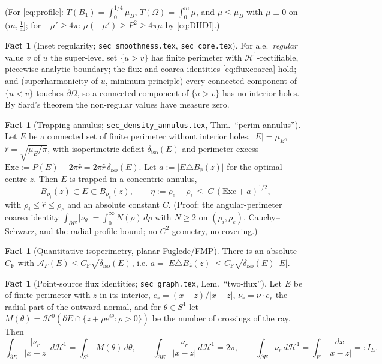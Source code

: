 \documentclass[11pt]{article}
\theoremstyle{definition}
\newtheorem{fact}[theorem]{Fact}
\newcommand{\Om}{\Omega}
\newcommand{\HH}{\mathcal H}
\newcommand{\diso}{\delta_{\mathrm{iso}}}
\newcommand{\AF}{\mathcal A_F}
\newcommand{\Exc}{\mathrm{Exc}}
\newcommand{\abs}[1]{\left|#1\right|}
\begin{document}
\noindent
(For \eqref{eq:profile}: $T(B_1)=\int_0^{1/4}\mu_B$, $T(\Om)=\int_0^m\mu$,
and $\mu\le\mu_B$ with $\mu\equiv0$ on $(m,\tfrac14]$; for $-\mu'\ge4\pi$:
$\mu(-\mu')\ge P^2\ge4\pi\mu$ by \eqref{eq:DHDI}.)

\begin{fact}[Inset regularity; \texttt{sec\_smoothness.tex},
\texttt{sec\_core.tex}]\label{fact:reg}
For a.e.\ \emph{regular} value $v$ of $u$ the super-level set $\{u>v\}$ has
finite perimeter with $\HH^1$-rectifiable, piecewise-analytic boundary; the
flux and coarea identities \eqref{eq:fluxcoarea} hold; and (superharmonicity
of $u$, minimum principle) every connected component of $\{u<v\}$ touches
$\partial\Om$, so a connected component of $\{u>v\}$ has no interior holes.
By Sard's theorem the non-regular values have measure zero.
\end{fact}

\begin{fact}[Trapping annulus; \texttt{sec\_density\_annulus.tex},
Thm.~``perim-annulus'']\label{fact:annulus}
Let $E$ be a connected set of finite perimeter without interior holes,
$\abs E=\mu_E$, $\hat r=\sqrt{\mu_E/\pi}$, with isoperimetric deficit
$\diso(E)$ and perimeter excess $\Exc:=P(E)-2\pi\hat r=2\pi\hat r\,\diso(E)$.
Let $a:=\abs{E\triangle B_{\hat r}(z)}$ for the optimal centre $z$. Then $E$
is trapped in a concentric annulus,
\begin{equation}\label{eq:annulus}
   B_{\rho_i}(z)\subset E\subset B_{\rho_e}(z),\qquad
   \eta:=\rho_e-\rho_i\ \le\ C\,(\Exc+a)^{1/2},
\end{equation}
with $\rho_i\le\hat r\le\rho_e$ and an absolute constant $C$. (Proof: the
angular-perimeter coarea identity
$\int_{\partial E}\abs{\nu_\theta}=\int_0^\infty N(\rho)\,d\rho$ with
$N\ge2$ on $(\rho_i,\rho_e)$, Cauchy--Schwarz, and the radial-profile bound;
no $C^2$ geometry, no covering.)
\end{fact}

\begin{fact}[Quantitative isoperimetry, planar Fuglede/FMP]\label{fact:fmp}
There is an absolute $C_{\mathrm F}$ with
$\AF(E)\le C_{\mathrm F}\sqrt{\diso(E)}$, i.e.
$a=\abs{E\triangle B_{\hat r}(z)}\le C_{\mathrm F}\sqrt{\diso(E)}\,\abs E$.
\end{fact}

\begin{fact}[Point-source flux identities; \texttt{sec\_graph.tex},
Lem.~``two-flux'']\label{fact:flux}
Let $E$ be of finite perimeter with $z$ in its interior, $e_r=(x-z)/|x-z|$,
$\nu_r=\nu\cdot e_r$ the radial part of the outward normal, and for
$\theta\in S^1$ let $M(\theta)=\HH^0(\partial E\cap\{z+\rho e^{i\theta}:
\rho>0\})$ be the number of crossings of the ray. Then
\begin{equation}\label{eq:two-flux}
   \int_{\partial E}\frac{\abs{\nu_r}}{\abs{x-z}}\,d\HH^1
   =\int_{S^1}M(\theta)\,d\theta,
   \qquad
   \int_{\partial E}\frac{\nu_r}{\abs{x-z}}\,d\HH^1=2\pi,
   \qquad
   \int_{\partial E}\nu_r\,d\HH^1=\int_E\frac{dx}{\abs{x-z}}=:I_E .
\end{equation}
\end{fact}
\end{document}
